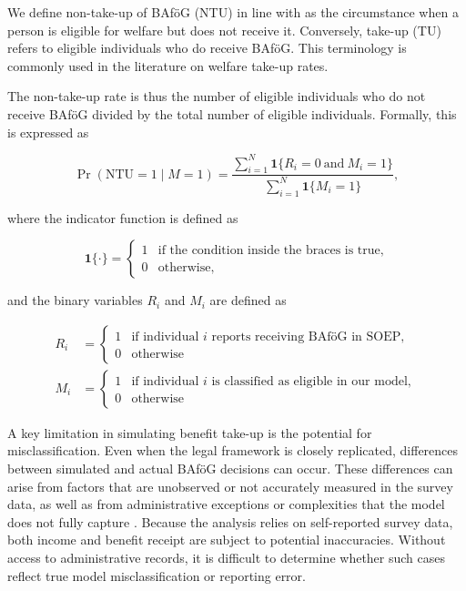 We define non-take-up of BAföG (NTU) in line with \cite{nelson_towards_2021} as the circumstance when a person is eligible for welfare but does not receive it. Conversely, take-up (TU) refers to eligible individuals who do receive BAföG. This terminology is commonly used in the literature on welfare take-up rates. 

The non-take-up rate is thus the number of eligible individuals who do not receive BAföG divided by the total number of eligible individuals. Formally, this is expressed as

\begin{equation}
\Pr(\text{NTU} = 1 \mid M = 1) = \frac{\sum_{i=1}^{N} \mathbf{1}\{R_i = 0 \ \text{and} \ M_i = 1\}}{\sum_{i=1}^{N} \mathbf{1}\{M_i = 1\}},
\end{equation}

where the indicator function is defined as

\begin{equation}
  \mathbf{1}\{\cdot\} =
  \begin{cases}
    1 & \text{if the condition inside the braces is true}, \\
    0 & \text{otherwise},
  \end{cases}
\end{equation}

and the binary variables \(R_i\) and \(M_i\) are defined as

\begin{equation}
\begin{aligned}
R_i &= \begin{cases}
1 & \text{if individual } i \text{ reports receiving BAföG in SOEP}, \\[4pt]
0 & \text{otherwise}
\end{cases} \\
M_i &= \begin{cases}
1 & \text{if individual } i \text{ is classified as eligible in our model}, \\[4pt]
0 & \text{otherwise}
\end{cases}
\end{aligned}
\end{equation}

A key limitation in simulating benefit take-up is the potential for misclassification. Even when the legal framework is closely replicated, differences between simulated and actual BAföG decisions can occur. These differences can arise from factors that are unobserved or not accurately measured in the survey data, as well as from administrative exceptions or complexities that the model does not fully capture \citep{frick_claim_2007, janssens_takemod_2022}. Because the analysis relies on self-reported survey data, both income and benefit receipt are subject to potential inaccuracies. Without access to administrative records, it is difficult to determine whether such cases reflect true model misclassification or reporting error.

